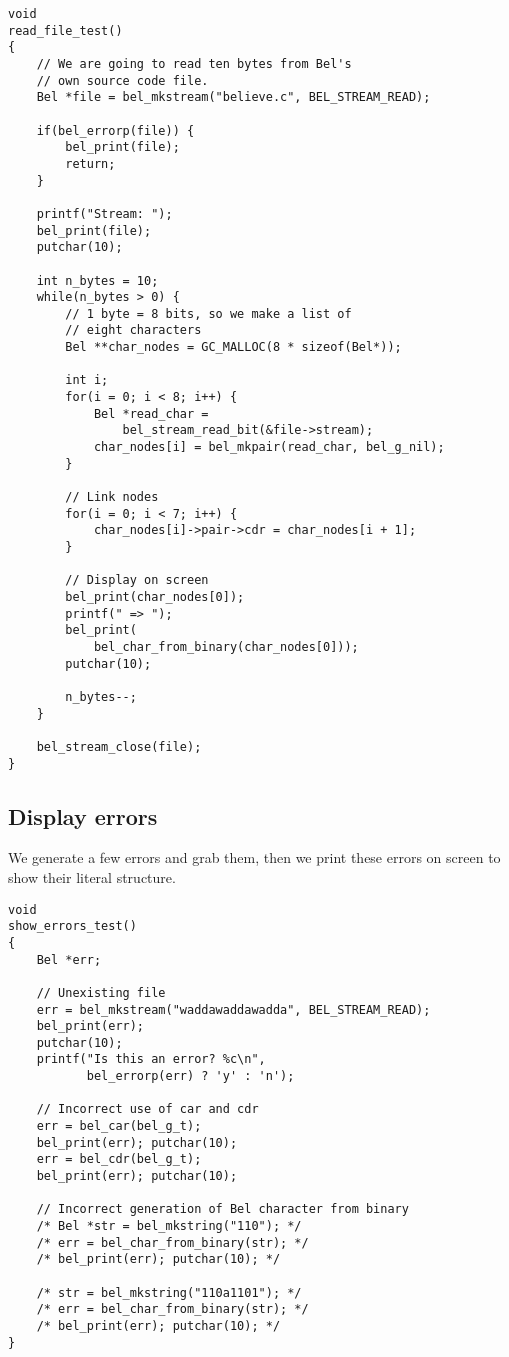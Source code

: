 \documentclass[openright,a4paper,twoside,12pt]{memoir}
\begin{document}
\begin{verbatim}
void
read_file_test()
{
    // We are going to read ten bytes from Bel's
    // own source code file.
    Bel *file = bel_mkstream("believe.c", BEL_STREAM_READ);

    if(bel_errorp(file)) {
        bel_print(file);
        return;
    }

    printf("Stream: ");
    bel_print(file);
    putchar(10);
    
    int n_bytes = 10;
    while(n_bytes > 0) {
        // 1 byte = 8 bits, so we make a list of
        // eight characters
        Bel **char_nodes = GC_MALLOC(8 * sizeof(Bel*));

        int i;
        for(i = 0; i < 8; i++) {
            Bel *read_char =
                bel_stream_read_bit(&file->stream);
            char_nodes[i] = bel_mkpair(read_char, bel_g_nil);
        }

        // Link nodes
        for(i = 0; i < 7; i++) {
            char_nodes[i]->pair->cdr = char_nodes[i + 1];
        }

        // Display on screen
        bel_print(char_nodes[0]);
        printf(" => ");
        bel_print(
            bel_char_from_binary(char_nodes[0]));
        putchar(10);
        
        n_bytes--;
    }

    bel_stream_close(file);
}
\end{verbatim}

\subsection{Display errors}
\label{sec:orge248adb}

We generate a few errors and grab them, then we print these errors on
screen to show their literal structure.

\begin{verbatim}
void
show_errors_test()
{
    Bel *err;
    
    // Unexisting file
    err = bel_mkstream("waddawaddawadda", BEL_STREAM_READ);
    bel_print(err);
    putchar(10);
    printf("Is this an error? %c\n",
           bel_errorp(err) ? 'y' : 'n');

    // Incorrect use of car and cdr
    err = bel_car(bel_g_t);
    bel_print(err); putchar(10);
    err = bel_cdr(bel_g_t);
    bel_print(err); putchar(10);

    // Incorrect generation of Bel character from binary
    /* Bel *str = bel_mkstring("110"); */
    /* err = bel_char_from_binary(str); */
    /* bel_print(err); putchar(10); */

    /* str = bel_mkstring("110a1101"); */
    /* err = bel_char_from_binary(str); */
    /* bel_print(err); putchar(10); */
}
\end{verbatim}
\end{document}
